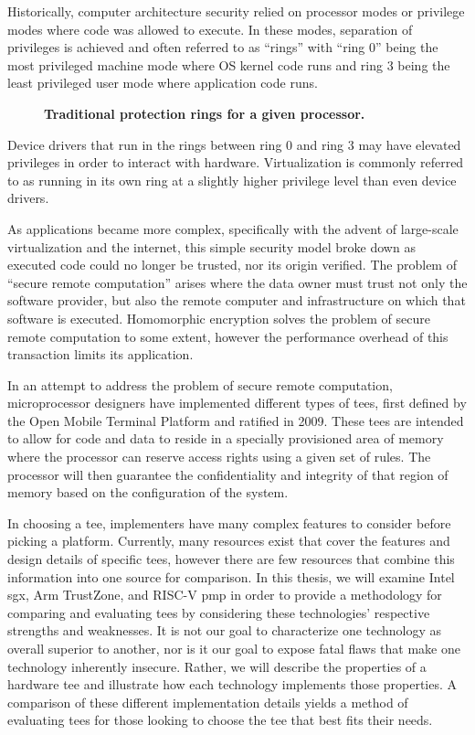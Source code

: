 Historically, computer architecture security relied on processor modes or privilege modes where code was allowed to execute. In these modes, separation of privileges is achieved and often referred to as ``rings'' with ``ring 0'' being the most privileged machine mode where OS kernel code runs and ring 3 being the least privileged user mode where application code runs.

\begin{figure}[htbp]
\centering

\caption[Protection Rings]{\textbf{Traditional protection rings for a given processor.}}
\label{fig:rings}
\end{figure}

\noindent Device drivers that run in the rings between ring 0 and ring 3 may have elevated privileges in order to interact with hardware. Virtualization is commonly referred to as running in its own ring at a slightly higher privilege level than even device drivers.  

As applications became more complex, specifically with the advent of large-scale virtualization and the internet, this simple security model broke down as executed code could no longer be trusted, nor its origin verified. The problem of ``secure remote computation'' arises where the data owner must trust not only the software provider, but also the remote computer and infrastructure on which that software is executed. Homomorphic encryption solves the problem of secure remote computation to some extent, however the performance overhead of this transaction limits its application. \cite{gentryPhd}

In an attempt to address the problem of secure remote computation, microprocessor designers have implemented different types of \glspl{tee}, first defined by the Open Mobile Terminal Platform and ratified in 2009. \cite{Confidential2009} These \glspl{tee} are intended to allow for code and data to reside in a specially provisioned area of memory where the processor can reserve access rights using a given set of rules. The processor will then guarantee the confidentiality and integrity of that region of memory based on the configuration of the system.

In choosing a \gls{tee}, implementers have many complex features to consider before picking a platform. Currently, many resources exist that cover the features and design details of specific \glspl{tee}, however there are few resources that combine this information into one source for comparison. In this thesis, we will examine Intel \gls{sgx}, Arm TrustZone, and RISC-V \gls{pmp} in order to provide a methodology for comparing and evaluating \glspl{tee} by considering these technologies' respective strengths and weaknesses. It is not our goal to characterize one technology as overall superior to another, nor is it our goal to expose fatal flaws that make one technology inherently insecure. Rather, we will describe the properties of a hardware \gls{tee} and illustrate how each technology implements those properties. A comparison of these different implementation details yields a method of evaluating \glspl{tee} for those looking to choose the \gls{tee} that best fits their needs.

